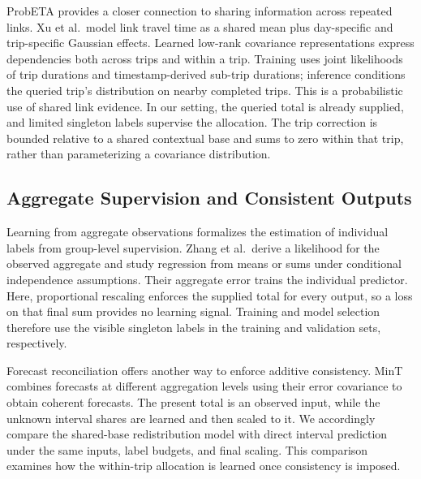 ProbETA provides a closer connection to sharing information across repeated links\cite{xu2025probeta}. Xu et al.\ model link travel time as a shared mean plus day-specific and trip-specific Gaussian effects. Learned low-rank covariance representations express dependencies both across trips and within a trip. Training uses joint likelihoods of trip durations and timestamp-derived sub-trip durations; inference conditions the queried trip's distribution on nearby completed trips. This is a probabilistic use of shared link evidence. In our setting, the queried total is already supplied, and limited singleton labels supervise the allocation. The trip correction is bounded relative to a shared contextual base and sums to zero within that trip, rather than parameterizing a covariance distribution.

\subsection{Aggregate Supervision and Consistent Outputs}
Learning from aggregate observations formalizes the estimation of individual labels from group-level supervision. Zhang et al.\ derive a likelihood for the observed aggregate and study regression from means or sums under conditional independence assumptions\cite{zhang2020aggregate}. Their aggregate error trains the individual predictor. Here, proportional rescaling enforces the supplied total for every output, so a loss on that final sum provides no learning signal. Training and model selection therefore use the visible singleton labels in the training and validation sets, respectively.

Forecast reconciliation offers another way to enforce additive consistency. MinT combines forecasts at different aggregation levels using their error covariance to obtain coherent forecasts\cite{wickramasuriya2019mint}. The present total is an observed input, while the unknown interval shares are learned and then scaled to it. We accordingly compare the shared-base redistribution model with direct interval prediction under the same inputs, label budgets, and final scaling. This comparison examines how the within-trip allocation is learned once consistency is imposed.
